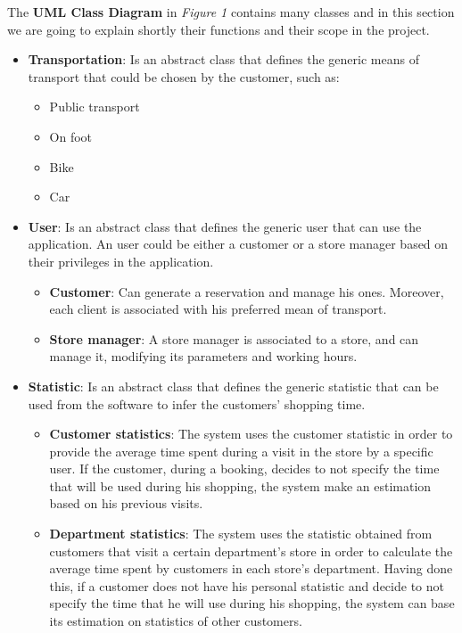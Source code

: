 \documentclass{article}
\begin{document}
			The {\bfseries UML Class Diagram} in \emph{Figure 1} contains many classes and in this section we are going to explain shortly their functions and their scope in the project.
			
			\begin{itemize}
				\item {\bfseries Transportation}: Is an abstract class that defines the generic means of transport that could be chosen by the customer, such as:
				
					\begin{itemize}
						\itemsep-0.20em
						\item Public transport
						\item On foot
						\item Bike
						\item Car
					\end{itemize}
				
				\item {\bfseries User}: Is an abstract class that defines the generic user that can use the application. An user could be either a customer or a store manager based on their privileges in the application.
				
					\begin{itemize}
						\item {\bfseries Customer}: Can generate a reservation and manage his ones. Moreover, each client is associated with his preferred mean of transport.						
						\item {\bfseries Store manager}: A store manager is associated to a store, and can manage it, modifying its parameters and working hours.
					\end{itemize}
				
				\item {\bfseries Statistic}: Is an abstract class that defines the generic statistic that can be used from the software to infer the customers' shopping time.			
				\begin{itemize}
					\item {\bfseries Customer statistics}: The system uses the customer statistic in order to provide the average time spent during a visit in the store by a specific user. If the customer, during a booking, decides to not specify the time that will be used during his shopping, the system make an estimation based on his previous visits.
					
					\item {\bfseries Department statistics}: The system uses the statistic obtained from customers that visit a certain department's store in order to calculate the average time spent by customers in each store's department. Having done this, if a customer does not have his personal statistic and decide to not specify the time that he will use during his shopping, the system can base its estimation on statistics of other customers. 
				

\end{itemize}
\end{itemize}
\end{document}
